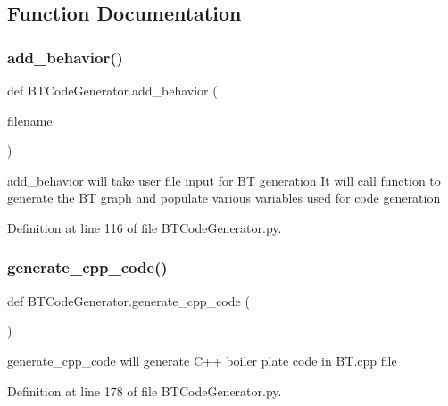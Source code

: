 \subsection{Function Documentation}
\mbox{\label{namespace_b_t_code_generator_af05eb4fb1b13c0354cdda3e602e1f3f7}} 
\subsubsection{\texorpdfstring{add\_behavior()}{add\_behavior()}}
{\footnotesize\ttfamily def B\+T\+Code\+Generator.\+add\+\_\+behavior (\begin{DoxyParamCaption}\item[{}]{filename }\end{DoxyParamCaption})}



\textquotesingle{}add\+\_\+behavior\textquotesingle{} will take user file input for BT generation It will call function to generate the BT graph and populate various variables used for code generation 



Definition at line 116 of file B\+T\+Code\+Generator.\+py.

\mbox{\label{namespace_b_t_code_generator_a30d522de4346ccb225624302e9f8759f}} 
\subsubsection{\texorpdfstring{generate\_cpp\_code()}{generate\_cpp\_code()}}
{\footnotesize\ttfamily def B\+T\+Code\+Generator.\+generate\+\_\+cpp\+\_\+code (\begin{DoxyParamCaption}{ }\end{DoxyParamCaption})}



\textquotesingle{}generate\+\_\+cpp\+\_\+code\textquotesingle{} will generate C++ boiler plate code in \textquotesingle{}B\+T.\+cpp\textquotesingle{} file 



Definition at line 178 of file B\+T\+Code\+Generator.\+py.

